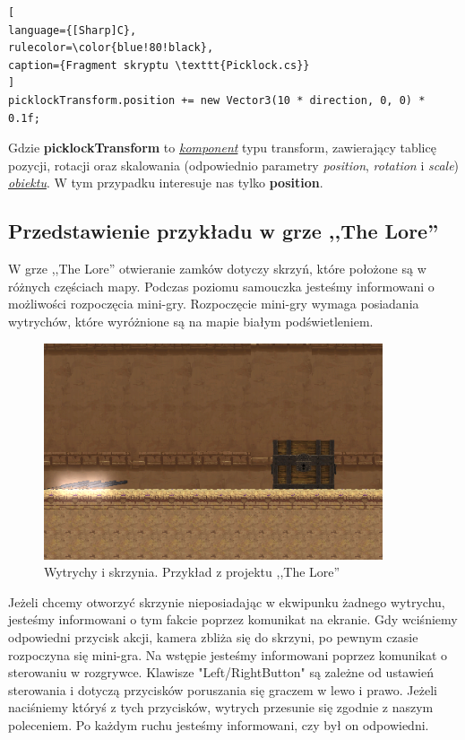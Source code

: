 \documentclass[oneside,polski,logo]{amuthesis}
\begin{document}
\begin{lstlisting}[
language={[Sharp]C},
rulecolor=\color{blue!80!black},
caption={Fragment skryptu \texttt{Picklock.cs}}
]
picklockTransform.position += new Vector3(10 * direction, 0, 0) * 0.1f;
\end{lstlisting}

Gdzie \textbf{picklockTransform} to \hyperref[sec:komponent]{\emph{komponent}} typu transform, zawierający tablicę pozycji, rotacji oraz skalowania (odpowiednio parametry \emph{position}, \emph{rotation} i \emph{scale}) \hyperref[sec:gameobject]{\emph{obiektu}}. W tym przypadku interesuje nas tylko \textbf{position}. 
\subsection{Przedstawienie przykładu w grze ,,The Lore''}
W grze ,,The Lore'' otwieranie zamków dotyczy skrzyń, które położone są w różnych częściach mapy. Podczas poziomu samouczka jesteśmy informowani o możliwości rozpoczęcia mini-gry. Rozpoczęcie mini-gry wymaga posiadania wytrychów, które wyróżnione są na mapie białym podświetleniem.

\begin{figure}[h]
	\centering
	\includegraphics[width=10cm]{images/tyrek/skrzynia.png}
	\caption{Wytrychy i skrzynia. Przykład z projektu ,,The Lore''}
\end{figure}

Jeżeli chcemy otworzyć skrzynie nieposiadając w ekwipunku żadnego wytrychu, jesteśmy informowani o tym fakcie poprzez komunikat na ekranie. Gdy wciśniemy odpowiedni przycisk akcji, kamera zbliża się do skrzyni, po pewnym czasie rozpoczyna się mini-gra.
Na wstępie jesteśmy informowani poprzez komunikat o sterowaniu w rozgrywce. Klawisze "Left/RightButton" są zależne od ustawień sterowania i dotyczą przycisków poruszania się graczem w lewo i prawo. Jeżeli naciśniemy któryś z tych przycisków, wytrych przesunie się zgodnie z naszym poleceniem. Po każdym ruchu jesteśmy informowani, czy był on odpowiedni.
\end{document}
